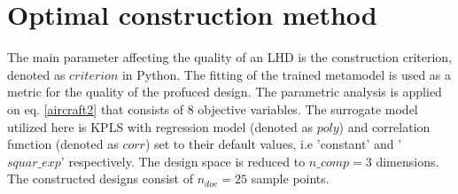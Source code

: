 \newpage

\section{Optimal construction method }
\label{appendix:constr_crit} 

The main parameter affecting the quality of an LHD is the
construction criterion, denoted as $criterion$ in Python. 
The fitting of the trained metamodel is used as a metric for the 
quality of the profuced design. The parametric analysis 
is applied on eq. \ref{aircraft2} that consists of 8 objective 
variables. The surrogate model utilized here is KPLS with 
regression model (denoted as $poly$) and correlation function 
(denoted as $corr$) set to their default values, i.e 
'constant' and '$squar\_exp$' respectively. The design space is 
reduced to $n\_comp = 3$ dimensions. The constructed designs 
consist of $n_{doe} \!= \! 25$ sample points.
 
\begin{table}[h]
\centering
{}
\caption{Average NRMSE of each construction criterion that resulted 
from the use of KPLS model for $n_{test} = 50$ times}
\label{table:construction_criterion_rms_error}
\end{table}
\vspace{-2mm}

